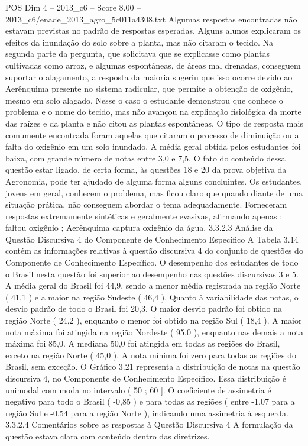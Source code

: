 \begin{textsample}{POS Dim 4 – 2013\_c6 – Score 8.00 – 2013\_c6/enade\_2013\_agro\_5c011a4308.txt}
Algumas respostas encontradas não estavam previstas no padrão de respostas esperadas.
Alguns alunos explicaram os efeitos da inundação do solo sobre a planta, mas não citaram o tecido.
Na segunda parte da pergunta, que solicitava que se explicasse como plantas cultivadas como arroz, e algumas espontâneas, de áreas mal drenadas, conseguem suportar o alagamento, a resposta da maioria sugeriu que isso ocorre devido ao Aerênquima presente no sistema radicular, que permite a obtenção de oxigênio, mesmo em solo alagado.
Nesse o caso o estudante demonstrou que conhece o problema e o nome do tecido, mas não avançou na explicação fisiológica da morte das raízes e da planta e não citou as plantas espontâneas.
O tipo de resposta mais comumente encontrada foram aquelas que citaram o processo de diminuição ou a falta do oxigênio em um solo inundado.
A média geral obtida pelos estudantes foi baixa, com grande número de notas entre 3,0 e 7,5.
O fato do conteúdo dessa questão estar ligado, de certa forma, às questões 18 e 20 da prova objetiva da Agronomia, pode ter ajudado de alguma forma alguns concluintes.
Os estudantes, jovens em geral, conhecem o problema, mas ficou claro que quando diante de uma situação prática, não conseguem abordar o tema adequadamente.
Forneceram respostas extremamente sintéticas e geralmente evasivas, afirmando apenas : faltou oxigênio ; Aerênquima captura oxigênio da água. 3.3.2.3 Análise da Questão Discursiva 4 do Componente de Conhecimento Específico A Tabela 3.14 contém as informações relativas à questão discursiva 4 do conjunto de questões do Componente de Conhecimento Específico.
O desempenho dos estudantes de todo o Brasil nesta questão foi superior ao desempenho nas questões discursivas 3 e 5.
A média geral do Brasil foi 44,9, sendo a menor média registrada na região Norte ( 41,1 ) e a maior na região Sudeste ( 46,4 ).
Quanto à variabilidade das notas, o desvio padrão de todo o Brasil foi 20,3.
O maior desvio padrão foi obtido na região Norte ( 24,2 ), enquanto o menor foi obtido na região Sul ( 18,4 ).
A maior nota máxima foi atingida na região Nordeste ( 95,0 ), enquanto nas demais a nota máxima foi 85,0.
A mediana 50,0 foi atingida em todas as regiões do Brasil, exceto na região Norte ( 45,0 ).
A nota mínima foi zero para todas as regiões do Brasil, sem exceção.
O Gráfico 3.21 representa a distribuição de notas na questão discursiva 4, no Componente de Conhecimento Específico.
Essa distribuição é unimodal com moda no intervalo ( 50 ; 60 ].
O coeficiente de assimetria é negativo para todo o Brasil ( -0,85 ) e para todas as regiões ( entre -1,07 para a região Sul e -0,54 para a região Norte ), indicando uma assimetria à esquerda. 3.3.2.4 Comentários sobre as respostas à Questão Discursiva 4 A formulação da questão estava clara com conteúdo dentro das diretrizes.

\end{textsample}
